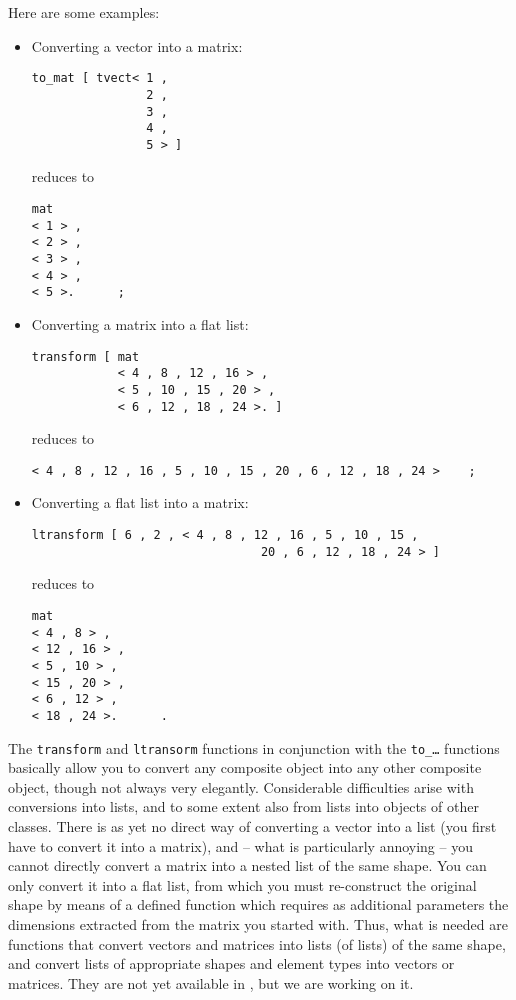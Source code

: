 Here are some examples:
\begin{itemize}
\item Converting a vector into a matrix:
\begin{verbatim} 
to_mat [ tvect< 1 ,
                2 ,
                3 ,
                4 ,
                5 > ]
\end{verbatim}
reduces to
\begin{verbatim}
mat 
< 1 > ,
< 2 > ,
< 3 > ,
< 4 > ,
< 5 >.      ;
\end{verbatim}
\item Converting a matrix into a flat list:
\begin{verbatim}
transform [ mat 
            < 4 , 8 , 12 , 16 > ,
            < 5 , 10 , 15 , 20 > ,
            < 6 , 12 , 18 , 24 >. ]
\end{verbatim}
reduces to
\begin{verbatim}
< 4 , 8 , 12 , 16 , 5 , 10 , 15 , 20 , 6 , 12 , 18 , 24 >    ;
\end{verbatim}
\item Converting a flat list into a matrix:
\begin{verbatim}
ltransform [ 6 , 2 , < 4 , 8 , 12 , 16 , 5 , 10 , 15 ,
                                20 , 6 , 12 , 18 , 24 > ]
\end{verbatim}
reduces to
\begin{verbatim}
mat 
< 4 , 8 > ,
< 12 , 16 > ,
< 5 , 10 > ,
< 15 , 20 > ,
< 6 , 12 > ,
< 18 , 24 >.      .
\end{verbatim}
\end{itemize}

The {\tt transform} and {\tt ltransorm} functions in conjunction
with the {\tt to\_\ldots} functions basically allow you to
 convert any
composite object into any other composite object, though  not 
always very  elegantly. Considerable difficulties arise with conversions
into lists, and to some extent also from lists into objects of
other classes. There is as yet no direct way of converting
a vector into a list (you first have to convert it into a matrix),
and -- what is particularly annoying -- you cannot directly convert
a matrix into a nested list of the same shape. You can only
convert it into a flat list, from which you must re-construct
the original shape by means of a defined function which requires
as additional parameters the dimensions extracted from the
 matrix you started with. Thus, what is needed are functions that
convert vectors and matrices into lists (of lists)
 of the same shape, and
convert lists of appropriate shapes and element types into
vectors or matrices. They are not yet available in \kir, but we are working on it. 
 
